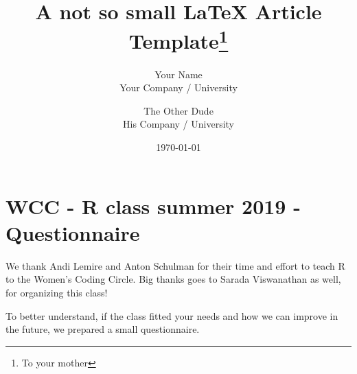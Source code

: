 \documentclass[12pt, a4paper, twoside, titlepage]{article}
\title{A not so small \LaTeX{} Article Template\thanks{To your mother}}
\author{Your Name  \\
	Your Company / University  \\
	\and
	The Other Dude \\
	His Company / University \\
	}
\date{\today}
\begin{document}




\section*{WCC - R class summer 2019 - Questionnaire}

We thank Andi Lemire and Anton Schulman for their time and effort to teach R to the Women's Coding Circle. Big thanks goes to Sarada Viswanathan as well, for organizing this class!

To better understand, if the class fitted your needs and how we can improve in the future, we prepared a small questionnaire.
\end{document}
